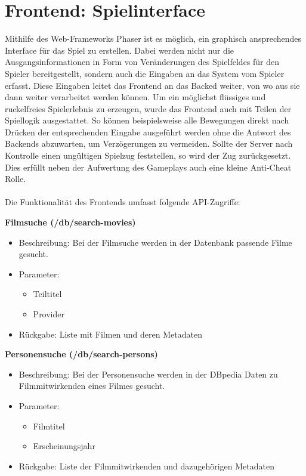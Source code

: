 \documentclass[conference]{IEEEtran}
\begin{document}
\section{Frontend: Spielinterface}
Mithilfe des Web-Frameworks Phaser ist es möglich, ein graphisch ansprechendes Interface für das Spiel zu erstellen. Dabei werden nicht nur die Ausgangsinformationen in Form von Veränderungen des Spielfeldes für den Spieler bereitgestellt, sondern auch die Eingaben an das System vom Spieler erfasst. Diese Eingaben leitet das Frontend an das Backed weiter, von wo aus sie dann weiter verarbeitet werden können. Um ein möglichst flüssiges und ruckelfreies Spielerlebnis zu erzeugen, wurde das Frontend auch mit Teilen der Spiellogik ausgestattet. So können beispielsweise alle Bewegungen direkt nach Drücken der entsprechenden Eingabe ausgeführt werden ohne die Antwort des Backends abzuwarten, um Verzögerungen zu vermeiden. Sollte der Server nach Kontrolle einen ungültigen Spielzug feststellen, so wird der Zug zurückgesetzt. Dies erfüllt neben der Aufwertung des Gameplays auch eine kleine Anti-Cheat Rolle.
\\
\\
Die Funktionalität des Frontends umfasst folgende API-Zugriffe:
\smallskip

\textbf{Filmsuche (/db/search-movies)}
\begin{itemize}
\item Beschreibung:
    Bei der Filmsuche werden in der Datenbank passende Filme gesucht.
\item Parameter:
\begin{itemize}
    \item Teiltitel
    \item Provider
\end{itemize}
\item Rückgabe:
    Liste mit Filmen und deren Metadaten
\end{itemize}

\smallskip

\textbf{Personensuche (/db/search-persons)}
\begin{itemize}
\item Beschreibung:
    Bei der Personensuche werden in der DBpedia Daten zu Filmmitwirkenden eines Filmes gesucht.
\item Parameter:
    \begin{itemize}
    \item Filmtitel
    \item Erscheinungsjahr
    \end{itemize}
\item Rückgabe:
    Liste der Filmmitwirkenden und dazugehörigen Metadaten
\end{itemize}
\end{document}
